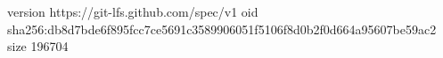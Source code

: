 version https://git-lfs.github.com/spec/v1
oid sha256:db8d7bde6f895fcc7ce5691c3589906051f5106f8d0b2f0d664a95607be59ac2
size 196704
